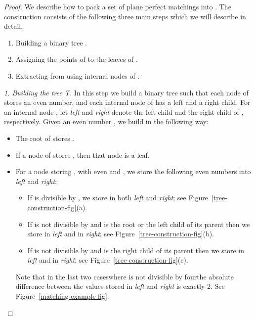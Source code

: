 \documentclass[11pt,a4paper]{article}
\newcommand{\LC}[1]{{\em left}}
\newcommand{\RC}[1]{{\em right}}
\begin{document}
\begin{proof}
We describe how to pack a set  of  plane perfect matchings into . The construction consists of the following three main steps which we will describe in detail.

\begin{enumerate}
  \item Building a binary tree .
  \item Assigning the points of  to the leaves of .
  \item Extracting  from  using internal nodes of .
\end{enumerate}

\begin{paragraph}{\em \small 1. Building the tree T.}
In this step we build a binary tree  such that each node of  stores an even number, and each internal node of  has a left and a right child. For an internal node , let \LC{u} and \RC{u} denote the left child and the right child of , respectively. Given an even number , we build  in the following way:
\begin{itemize}
  \item The root of  stores .
  \item If a node of  stores , then that node is a leaf.
  \item For a node  storing , with  even and , we store the following even numbers into \LC{u} and \RC{u}:
    \begin{itemize}
	\item If  is divisible by , we store  in both \LC{u} and \RC{u}; see Figure~\ref{tree-construction-fig}(a).
	\item If  is not divisible by  and  is the root or the left child of its parent then we store  in \LC{u} and  in \RC{u}; see Figure~\ref{tree-construction-fig}(b).
	\item If  is not divisible by  and  is the right child of its parent then we store  in \LC{u} and  in \RC{u}; see Figure~\ref{tree-construction-fig}(c).
    \end{itemize}
Note that in the last two cases\textemdash where  is not divisible by four\textemdash the absolute difference between the values stored in \LC{u} and \RC{u} is exactly 2. See Figure~\ref{matching-example-fig}.
\end{itemize}
\end{paragraph}

\begin{figure}[htb]
  \centering
\setlength{\tabcolsep}{0in}
  

\end{figure}
\end{proof}
\end{document}
